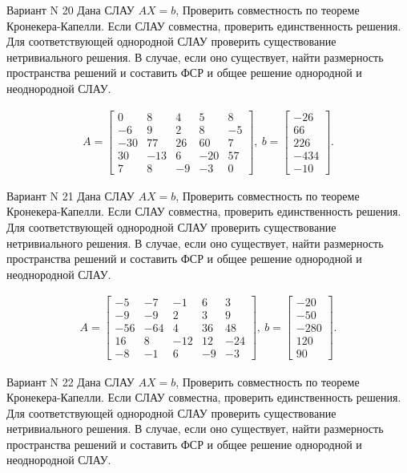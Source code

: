 \documentclass[11pt]{report}
\begin{document}
Вариант N 20
Дана СЛАУ $AX = b$,
Проверить совместность по теореме Кронекера-Капелли. Если СЛАУ совместна, проверить единственность решения.
Для соответствующей однородной СЛАУ проверить существование нетривиального решения. В случае, если оно существует,
найти размерность пространства решений и составить ФСР и общее решение однородной  и неоднородной СЛАУ.


\begin{align*}
 A = \left[\begin{matrix}0 & 8 & 4 & 5 & 8\\-6 & 9 & 2 & 8 & -5\\-30 & 77 & 26 & 60 & 7\\30 & -13 & 6 & -20 & 57\\7 & 8 & -9 & -3 & 0\end{matrix}\right],
\ b = \left[\begin{matrix}-26\\66\\226\\-434\\-10\end{matrix}\right]. 
 \end{align*}

Вариант N 21
Дана СЛАУ $AX = b$,
Проверить совместность по теореме Кронекера-Капелли. Если СЛАУ совместна, проверить единственность решения.
Для соответствующей однородной СЛАУ проверить существование нетривиального решения. В случае, если оно существует,
найти размерность пространства решений и составить ФСР и общее решение однородной  и неоднородной СЛАУ.


\begin{align*}
 A = \left[\begin{matrix}-5 & -7 & -1 & 6 & 3\\-9 & -9 & 2 & 3 & 9\\-56 & -64 & 4 & 36 & 48\\16 & 8 & -12 & 12 & -24\\-8 & -1 & 6 & -9 & -3\end{matrix}\right],
\ b = \left[\begin{matrix}-20\\-50\\-280\\120\\90\end{matrix}\right]. 
 \end{align*}

Вариант N 22
Дана СЛАУ $AX = b$,
Проверить совместность по теореме Кронекера-Капелли. Если СЛАУ совместна, проверить единственность решения.
Для соответствующей однородной СЛАУ проверить существование нетривиального решения. В случае, если оно существует,
найти размерность пространства решений и составить ФСР и общее решение однородной  и неоднородной СЛАУ.
\end{document}
